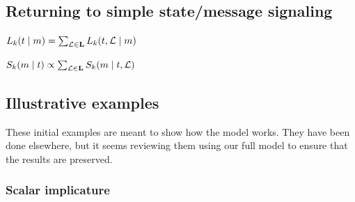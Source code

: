 \documentclass{article}
\begin{document}

\subsection{Returning to simple state/message signaling}

\begin{examples}
\item\label{lisnorm} $L_{k}(t \mid m)  = \sum_{\mathcal{L} \in \mathbf{L}} L_{k}(t, \mathcal{L} \mid m)$
\item\label{spknorm} $S_{k}(m \mid t) \propto \sum_{\mathcal{L} \in \mathbf{L}} S_{k}(m \mid t, \mathcal{L})$
\end{examples}


\subsection{Illustrative examples}\label{sec:illustrations}

\begin{examples}
\item These initial examples are meant to show how the model works.
  They have been done elsewhere, but it seems reviewing them using our
  full model to ensure that the results are preserved.

\end{examples}


\subsubsection{Scalar implicature}\label{sec:scalar}

\newcommand{\scalarstate}[1]{w_{#1}}
\newcommand{\wALL}{\scalarstate{\forall}}
\newcommand{\wSOMENOTALL}{\scalarstate{\exists\neg\forall}}

\newcommand{\scalarmsg}[1]{\text{#1}}
\newcommand{\mAll}{\scalarmsg{all}}
\newcommand{\mSome}{\scalarmsg{some}}
\newcommand{\mSomevAll}{\scalarmsg{some or all}}
\end{document}
